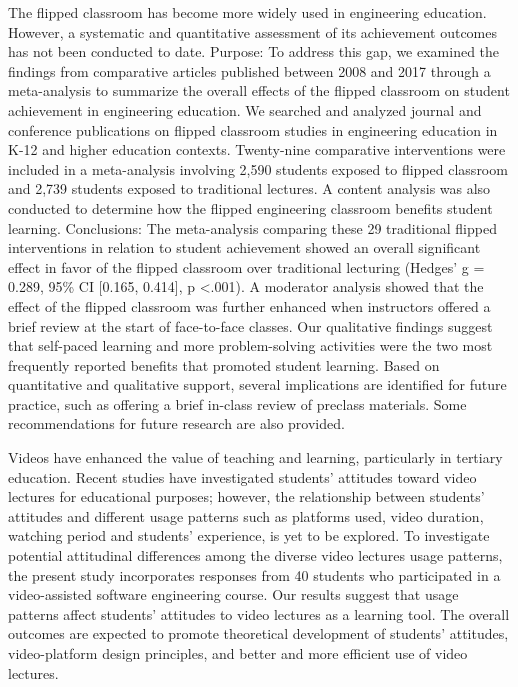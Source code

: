 The flipped classroom has become more widely used in engineering education. However, a systematic and quantitative assessment of its achievement outcomes has not been conducted to date. Purpose: To address this gap, we examined the findings from comparative articles published between 2008 and 2017 through a meta-analysis to summarize the overall effects of the flipped classroom on student achievement in engineering education. We searched and analyzed journal and conference publications on flipped classroom studies in engineering education in K-12 and higher education contexts. Twenty-nine comparative interventions were included in a meta-analysis involving 2,590 students exposed to flipped classroom and 2,739 students exposed to traditional lectures. A content analysis was also conducted to determine how the flipped engineering classroom benefits student learning. Conclusions: The meta-analysis comparing these 29 traditional flipped interventions in relation to student achievement showed an overall significant effect in favor of the flipped classroom over traditional lecturing (Hedges' g = 0.289, 95\% CI [0.165, 0.414], p <.001). A moderator analysis showed that the effect of the flipped classroom was further enhanced when instructors offered a brief review at the start of face-to-face classes. Our qualitative findings suggest that self-paced learning and more problem-solving activities were the two most frequently reported benefits that promoted student learning. Based on quantitative and qualitative support, several implications are identified for future practice, such as offering a brief in-class review of preclass materials. Some recommendations for future research are also provided.\cite{Lo2019}


Videos have enhanced the value of teaching and learning, particularly in tertiary education. Recent studies have investigated students' attitudes toward video lectures for educational purposes; however, the relationship between students' attitudes and different usage patterns such as platforms used, video duration, watching period and students' experience, is yet to be explored. To investigate potential attitudinal differences among the diverse video lectures usage patterns, the present study incorporates responses from 40 students who participated in a video-assisted software engineering course. Our results suggest that usage patterns affect students' attitudes to video lectures as a learning tool. The overall outcomes are expected to promote theoretical development of students' attitudes, video-platform design principles, and better and more efficient use of video lectures.\cite{Giannakos2016}



